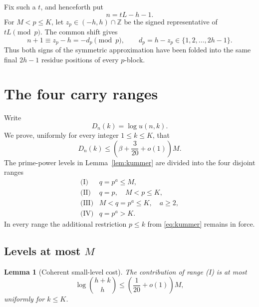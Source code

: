 \documentclass[11pt]{article}
\newtheorem{lemma}[theorem]{Lemma}
\theoremstyle{remark}
\begin{document}
Fix such a \(t\), and henceforth put
\begin{equation}\label{eq:def-n}
 n=tL-h-1.
\end{equation}
For \(M<p\leq K\), let \(z_p\in(-h,h)\cap\mathbb Z\) be the signed
representative of \(tL\pmod p\).  The common shift gives
\begin{equation}\label{eq:affine-fold}
 n+1\equiv z_p-h=-d_p\pmod p,
 \qquad
 d_p=h-z_p\in\{1,2,\ldots,2h-1\}.
\end{equation}
Thus both signs of the symmetric approximation have been folded into the
same final \(2h-1\) residue positions of every \(p\)-block.

\section{The four carry ranges}\label{sec:budget}

Write
\begin{equation}\label{eq:Dnk}
 D_n(k)=\log u(n,k).
\end{equation}
We prove, uniformly for every integer \(1\leq k\leq K\), that
\begin{equation}\label{eq:budget-goal}
 D_n(k)\leq\left(\beta+\frac3{20}+o(1)\right)M.
\end{equation}
The prime-power levels in Lemma~\ref{lem:kummer} are divided into the four
disjoint ranges
\[
 \begin{array}{ll}
 \text{(I)}&q=p^a\leq M,\\
 \text{(II)}&q=p,\quad M<p\leq K,\\
 \text{(III)}&M<q=p^a\leq K,\quad a\geq2,\\
 \text{(IV)}&q=p^a>K.
 \end{array}
\]
In every range the additional restriction \(p\leq k\) from
\eqref{eq:kummer} remains in force.

\subsection{\texorpdfstring{Levels at most \(M\)}{Levels at most M}}

\begin{lemma}[Coherent small-level cost]\label{lem:small-level}
The contribution of range \emph{(I)} is at most
\begin{equation}\label{eq:small-binomial}
 \log\binom{h+k}{h}
 \leq\left(\frac1{20}+o(1)\right)M,
\end{equation}
uniformly for \(k\leq K\).
\end{lemma}
\end{document}
